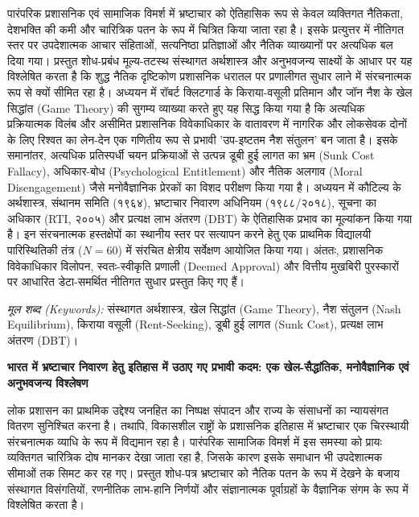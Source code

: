 \documentclass[11pt, a4paper]{article}
\begin{document}
\noindent पारंपरिक प्रशासनिक एवं सामाजिक विमर्श में भ्रष्टाचार को ऐतिहासिक रूप से केवल व्यक्तिगत नैतिकता, देशभक्ति की कमी और चारित्रिक पतन के रूप में चित्रित किया जाता रहा है। इसके प्रत्युत्तर में नीतिगत स्तर पर उपदेशात्मक आचार संहिताओं, सत्यनिष्ठा प्रतिज्ञाओं और नैतिक व्याख्यानों पर अत्यधिक बल दिया गया। प्रस्तुत शोध-प्रबंध मूल्य-तटस्थ संस्थागत अर्थशास्त्र और अनुभवजन्य साक्ष्यों के आधार पर यह विश्लेषित करता है कि शुद्ध नैतिक दृष्टिकोण प्रशासनिक धरातल पर प्रणालीगत सुधार लाने में संरचनात्मक रूप से क्यों सीमित रहा है। अध्ययन में रॉबर्ट क्लिटगार्ड के किराया-वसूली प्रतिमान और जॉन नैश के खेल सिद्धांत (Game Theory) की सुगम्य व्याख्या करते हुए यह सिद्ध किया गया है कि अत्यधिक प्रक्रियात्मक विलंब और असीमित प्रशासनिक विवेकाधिकार के वातावरण में नागरिक और लोकसेवक दोनों के लिए रिश्वत का लेन-देन एक गणितीय रूप से प्रभावी 'उप-इष्टतम नैश संतुलन' बन जाता है। इसके समानांतर, अत्यधिक प्रतिस्पर्धी चयन प्रक्रियाओं से उत्पन्न डूबी हुई लागत का भ्रम (Sunk Cost Fallacy), अधिकार-बोध (Psychological Entitlement) और नैतिक अलगाव (Moral Disengagement) जैसे मनोवैज्ञानिक प्रेरकों का विशद परीक्षण किया गया है। अध्ययन में कौटिल्य के अर्थशास्त्र, संथानम समिति (१९६४), भ्रष्टाचार निवारण अधिनियम (१९८८/२०१८), सूचना का अधिकार (RTI, २००५) और प्रत्यक्ष लाभ अंतरण (DBT) के ऐतिहासिक प्रभाव का मूल्यांकन किया गया है। इन संरचनात्मक हस्तक्षेपों का स्थानीय स्तर पर सत्यापन करने हेतु एक प्राथमिक विद्यालयी पारिस्थितिकी तंत्र ($N=60$) में संरचित क्षेत्रीय सर्वेक्षण आयोजित किया गया। अंततः, प्रशासनिक विवेकाधिकार विलोपन, स्वतः-स्वीकृति प्रणाली (Deemed Approval) और वित्तीय मुखबिरी पुरस्कारों पर आधारित डेटा-समर्थित नीतिगत सुधार प्रस्तुत किए गए हैं।

\vspace{1\baselineskip}
\noindent \textit{मूल शब्द (Keywords):} संस्थागत अर्थशास्त्र, खेल सिद्धांत (Game Theory), नैश संतुलन (Nash Equilibrium), किराया वसूली (Rent-Seeking), डूबी हुई लागत (Sunk Cost), प्रत्यक्ष लाभ अंतरण (DBT)।

\newpage
\begin{center}
    \textbf{भारत में भ्रष्टाचार निवारण हेतु इतिहास में उठाए गए प्रभावी कदम: एक खेल-सैद्धांतिक, मनोवैज्ञानिक एवं अनुभवजन्य विश्लेषण}
\end{center}

लोक प्रशासन का प्राथमिक उद्देश्य जनहित का निष्पक्ष संपादन और राज्य के संसाधनों का न्यायसंगत वितरण सुनिश्चित करना है। तथापि, विकासशील राष्ट्रों के प्रशासनिक इतिहास में भ्रष्टाचार एक चिरस्थायी संरचनात्मक व्याधि के रूप में विद्यमान रहा है। पारंपरिक सामाजिक विमर्श में इस समस्या को प्रायः व्यक्तिगत चारित्रिक दोष मानकर देखा जाता रहा है, जिसके कारण इसके समाधान भी उपदेशात्मक सीमाओं तक सिमट कर रह गए। प्रस्तुत शोध-पत्र भ्रष्टाचार को नैतिक पतन के रूप में देखने के बजाय संस्थागत विसंगतियों, रणनीतिक लाभ-हानि निर्णयों और संज्ञानात्मक पूर्वाग्रहों के वैज्ञानिक संगम के रूप में विश्लेषित करता है।
\end{document}

